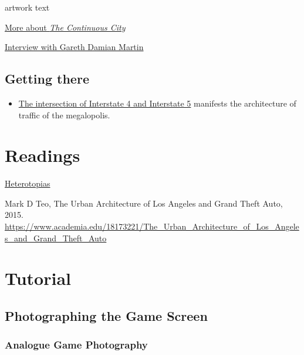 \documentclass[
  openany]{book}
\providecommand{\tightlist}{%
  \setlength{\itemsep}{0pt}\setlength{\parskip}{0pt}}
\begin{document}
artwork text

\href{https://socks-studio.com/2019/10/13/gareth-damian-martin-postcards-from-the-continuous-city-2018/}{More about \emph{The Continuous City}}

\href{https://www.gamescenes.org/2018/04/interview-gareth-damian-martin-the-aesthetics-of-analogue-game-photography.html}{Interview with Gareth Damian Martin}

\hypertarget{getting-there}{%
\subsection*{Getting there}\label{getting-there}}

\begin{itemize}
\tightlist
\item
  \href{https://grandtheftdata.com/landmarks/\#951.507,-1144.265,4,atlas,name=trainyard_warehouse,Trainyard_Warehouse,_East_Los_Santos}{The intersection of Interstate 4 and Interstate 5} manifests the architecture of traffic of the megalopolis.
\end{itemize}

\hypertarget{readings}{%
\section*{Readings}\label{readings}}

\href{https://www.heterotopiaszine.com/}{Heterotopias}

Mark D Teo, The Urban Architecture of Los Angeles and Grand Theft Auto, 2015. \url{https://www.academia.edu/18173221/The_Urban_Architecture_of_Los_Angeles_and_Grand_Theft_Auto}

\hypertarget{tutorial}{%
\section*{Tutorial}\label{tutorial}}

\hypertarget{photographing-the-game-screen}{%
\subsection*{Photographing the Game Screen}\label{photographing-the-game-screen}}

\hypertarget{analogue-game-photography}{%
\subsubsection*{Analogue Game Photography}\label{analogue-game-photography}}
\end{document}
